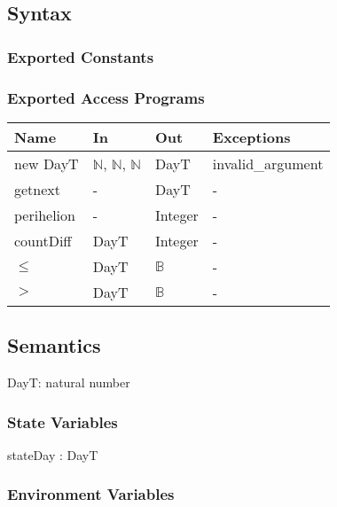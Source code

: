\documentclass[12pt, titlepage]{article}
\begin{document}
\subsection{Syntax}

\subsubsection{Exported Constants}


\subsubsection{Exported Access Programs}

\begin{center}
\begin{tabular}{p{3cm} p{5cm} p{4cm} p{2cm}}
\hline
\textbf{Name} & \textbf{In} & \textbf{Out} & \textbf{Exceptions} \\
\hline
new DayT& $\mathbb{N}$, $\mathbb{N}$, $\mathbb{N}$ & DayT & invalid\_argument \\
getnext &  -  & DayT & - \\
perihelion &  -  & Integer & - \\
countDiff &  DayT  & Integer & - \\
$\leq$ &  DayT  & $\mathbb{B}$ & - \\
$>$ &  DayT  & $\mathbb{B}$ & - \\
\hline
\end{tabular}
\end{center}

 

\subsection{Semantics}
DayT: natural number

\subsubsection{State Variables}

stateDay : DayT \\

\subsubsection{Environment Variables}
\end{document}
